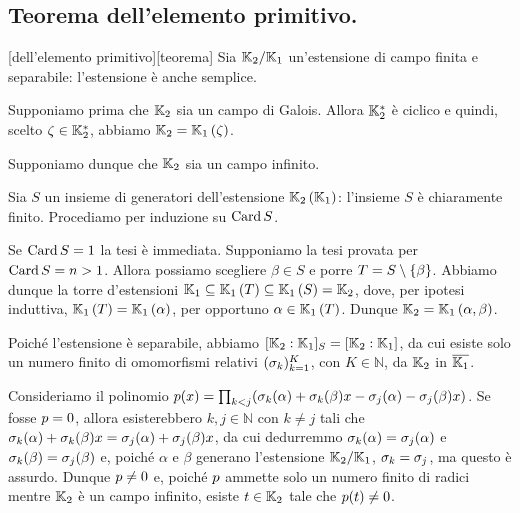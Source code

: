 \subsection{Teorema dell'elemento primitivo.}\label{TeoremaDellElementoPrimitivo}
\begin{Theorem}
	[dell'elemento primitivo][teorema] Sia $\mathbb{K}_2/\mathbb{K}_1$ un'estensione di campo finita e separabile: l'estensione \`e anche semplice.
\end{Theorem}
\Proof Supponiamo prima che $\mathbb{K}_2$ sia un campo di Galois. Allora $\mathbb{K}_2^*$ \`e ciclico e quindi, scelto $\zeta \in \mathbb{K}_2^*$, abbiamo $\mathbb{K}_2 = \mathbb{K}_1 \left ( \zeta \right )$.
\par Supponiamo dunque che $\mathbb{K}_2$ sia un campo infinito.
\par Sia $S$ un insieme di generatori dell'estensione $\mathbb{K}_2 \left ( \mathbb{K}_1 \right )$: l'insieme $S$ \`e chiaramente finito. Procediamo per induzione su $\operatorname{Card}{S}$.
\par Se $\operatorname{Card}{S} = 1$ la tesi \`e immediata. Supponiamo la tesi provata per $\operatorname{Card}{S} = n > 1$. Allora possiamo scegliere $\beta \in S$ e porre $T = S \setminus \lbrace \beta \rbrace$. Abbiamo dunque la torre d'estensioni $\mathbb{K}_1 \subseteq \mathbb{K}_1 \left ( T \right ) \subseteq \mathbb{K}_1 \left ( S \right ) = \mathbb{K}_2$, dove, per ipotesi induttiva, $\mathbb{K}_1 \left ( T \right ) = \mathbb{K}_1 \left ( \alpha \right )$, per opportuno $\alpha \in \mathbb{K}_1 \left ( T \right )$. Dunque $\mathbb{K}_2 = \mathbb{K}_1 \left ( \alpha,\beta \right )$.
\par Poich\'e l'estensione \`e separabile, abbiamo $[\mathbb{K}_2:\mathbb{K}_1]_S = [\mathbb{K}_2:\mathbb{K}_1]$, da cui esiste solo un numero finito di omomorfismi relativi $(\sigma_k)_{k = 1}^K$, con $K \in \mathbb{N}$, da $\mathbb{K}_2$ in $\overline{\mathbb{K}_1}$.
\par Consideriamo il polinomio $p(x) = \prod_{k < j} (\sigma_k(\alpha) + \sigma_k(\beta)x - \sigma_j(\alpha) - \sigma_j(\beta)x)$. Se fosse $p = 0$, allora esisterebbero $k, j \in \mathbb{N}$ con $k \neq j$ tali che $\sigma_k(\alpha) + \sigma_k(\beta)x = \sigma_j(\alpha) + \sigma_j(\beta)x$, da cui dedurremmo $\sigma_k(\alpha) = \sigma_j(\alpha)$ e $\sigma_k(\beta) = \sigma_j(\beta)$ e, poich\'e $\alpha$ e $\beta$ generano l'estensione $\mathbb{K}_2/\mathbb{K}_1$, $\sigma_k = \sigma_j$, ma questo \`e assurdo. Dunque $p \neq 0$ e, poich\'e $p$ ammette solo un numero finito di radici mentre $\mathbb{K}_2$ \`e un campo infinito, esiste $t \in \mathbb{K}_2$ tale che $p(t) \neq 0$.
